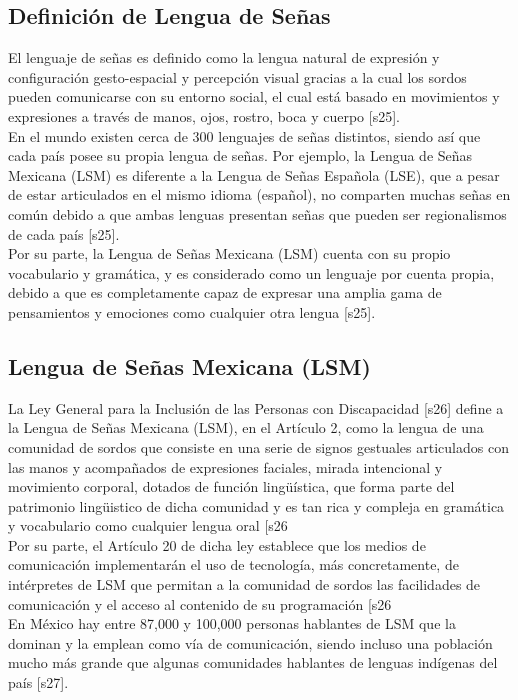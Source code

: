 \subsection{Definición de Lengua de Señas}
El lenguaje de señas es definido como la lengua natural de expresión y configuración gesto-espacial y percepción visual gracias a la cual los sordos pueden comunicarse con su entorno social, el cual está basado en movimientos y expresiones a través de manos, ojos, rostro, boca y cuerpo [s25].\\

En el mundo existen cerca de 300 lenguajes de señas distintos, siendo así que cada país posee su propia lengua de señas. Por ejemplo, la Lengua de Señas Mexicana (LSM) es diferente a la Lengua de Señas Española (LSE), que a pesar de estar articulados en el mismo idioma (español), no comparten muchas señas en común debido a que ambas lenguas presentan señas que pueden ser regionalismos de cada país [s25].\\

Por su parte, la Lengua de Señas Mexicana (LSM) cuenta con su propio vocabulario y gramática, y es considerado como un lenguaje por cuenta propia, debido a que es completamente capaz de expresar una amplia gama de pensamientos y emociones como cualquier otra lengua [s25].

\subsection{Lengua de Señas Mexicana (LSM)}
La Ley General para la Inclusión de las Personas con Discapacidad [s26] define a la Lengua de Señas Mexicana (LSM), en el Artículo 2, como la lengua de una comunidad de sordos que consiste en una serie de signos gestuales articulados con las manos y acompañados de expresiones faciales, mirada intencional y movimiento corporal, dotados de función lingüística, que forma parte del patrimonio lingüistico de dicha comunidad y es tan rica y compleja en gramática y vocabulario como cualquier lengua oral [s26\\

Por su parte, el Artículo 20 de dicha ley establece que los medios de comunicación implementarán el uso de tecnología, más concretamente, de intérpretes de LSM que permitan a la comunidad de sordos las facilidades de comunicación y el acceso al contenido de su programación [s26\\

En México hay entre 87,000 y 100,000 personas hablantes de LSM que la dominan y la emplean como vía de comunicación, siendo incluso una población mucho más grande que algunas comunidades hablantes de lenguas indígenas del país [s27].\\

